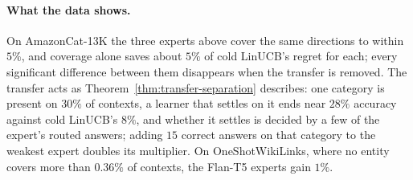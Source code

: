 \documentclass{article}
\theoremstyle{definition}
\theoremstyle{remark}
\theoremstyle{remark}
\begin{document}
\paragraph{What the data shows.}
On AmazonCat-13K the three experts above cover the same directions to within
$5\%$, and coverage alone saves about $5\%$ of cold LinUCB's regret for each;
every significant difference between them disappears when the transfer is
removed. The transfer acts as Theorem~\ref{thm:transfer-separation}
describes: one category is present on $30\%$ of contexts, a learner that
settles on it ends near $28\%$ accuracy against cold LinUCB's $8\%$, and
whether it settles is decided by a few of the expert's routed answers; adding
$15$ correct answers on that category to the weakest expert doubles its
multiplier. On OneShotWikiLinks, where no entity covers more than $0.36\%$ of
contexts, the Flan-T5 experts gain $1\%$.
\end{document}
